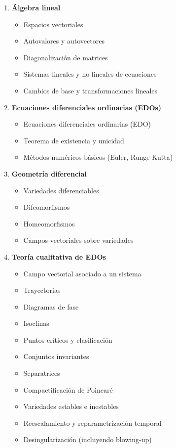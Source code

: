 \begin{enumerate}
	\item \textbf{Álgebra lineal}
	\begin{itemize}
		\item Espacios vectoriales
		\item Autovalores y autovectores \checkmark \cite[p. 182]{hoffman1961linear}
		\item Diagonalización de matrices \checkmark
		\item Sistemas lineales y no lineales de ecuaciones \checkmark
		\item Cambios de base y transformaciones lineales
	\end{itemize}
	
	\item \textbf{Ecuaciones diferenciales ordinarias (EDOs)}
	\begin{itemize}
		\item Ecuaciones diferenciales ordinarias (EDO) \checkmark  \cite[p. 6]{teschl2012}
		\item Teorema de existencia y unicidad \checkmark \cite[p. 74]{perko2001}
		\item Métodos numéricos básicos (Euler, Runge-Kutta)
	\end{itemize}
	
	
	\item \textbf{Geometría diferencial}
	\begin{itemize}
		\item Variedades diferenciables
		\item Difeomorfismos
		\item Homeomorfismos
		\item Campos vectoriales sobre variedades
	\end{itemize}
	
	\item \textbf{Teoría cualitativa de EDOs}
	\begin{itemize}
		\item Campo vectorial asociado a un sistema \checkmark \cite[p. 128]{teschl2012}
		\item Trayectorias \checkmark \cite[p. 128]{teschl2012}
		\item Diagramas de fase \checkmark
		\item Isoclinas \checkmark  \cite[p. 53-54]{guckenheimer1983}
		\item Puntos críticos y clasificación \checkmark \cite[p. 102]{perko2001}
		\item Conjuntos invariantes \checkmark \cite[p. 99]{perko2001}
		\item Separatrices
		\item Compactificación de Poincaré
		\item Variedades estables e inestables \cite[p. 13]{guckenheimer1983}
		\item Reescalamiento y reparametrización temporal
		\item Desingularización (incluyendo blowing-up)
	\end{itemize}
	

\end{enumerate}
